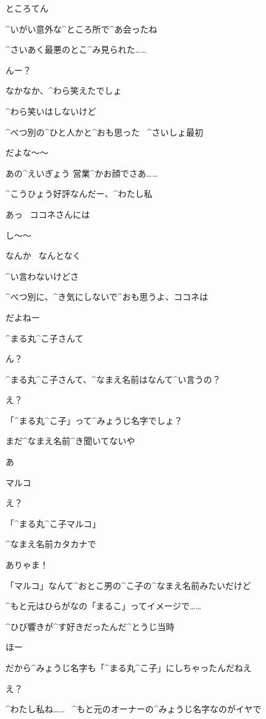 \page
\Sign ところてん

\A ^{いがい}{意外}な^{ところ}{所}で^{あ}{会}ったね

\R ^{さいあく}{最悪}のとこ^{み}{見}られた……

\A んー？

\R なかなか、^{わら}{笑}えたでしょ

\A ^{わら}{笑}いはしないけど

\page
\A ^{べつ}{別}の^{ひと}{人}かと^{おも}{思}った
\ ^{さいしょ}{最初}

\R だよな〜〜

\R あの^{えいぎょう }{営業}^{かお}{顔}でさあ……

\R ^{こうひょう}{好評}なんだー、^{わたし}{私}

\page
\R あっ
\ ココネさんには

\R し〜〜

\R なんか
\ なんとなく

\A ^{い}{言}わないけどさ

\A ^{べつ}{別}に、^{き}{気}にしないで^{おも}{思}うよ、ココネは

\R だよねー

\page
\A ^{まる}{丸}^{こ}{子}さんて

\R ん？

\A ^{まる}{丸}^{こ}{子}さんて、^{なまえ}{名前}はなんて^{い}{言}うの？

\R え？

\A 「^{まる}{丸}^{こ}{子}」って^{みょうじ}{名字}でしょ？

\A まだ^{なまえ}{名前}^{き}{聞}いてないや

\R あ

\R マルコ

\A え？

\page
\R 「^{まる}{丸}^{こ}{子}マルコ」

\R ^{なまえ}{名前}カタカナで

\A ありゃま！

\R 「マルコ」なんて^{おとこ}{男}の^{こ}{子}の^{なまえ}{名前}みたいだけど

\R ^{もと}{元}はひらがなの「まるこ」ってイメージで……

\R ^{ひび}{響}きが^{す}{好}きだったんだ^{とうじ}{当時}

\A ほー

\R だから^{みょうじ}{名字}も「^{まる}{丸}^{こ}{子}」にしちゃったんだねえ

\A え？

\page
\R ^{わたし}{私}ね……
\ ^{もと}{元}のオーナーの^{みょうじ}{名字}なのがイヤで

